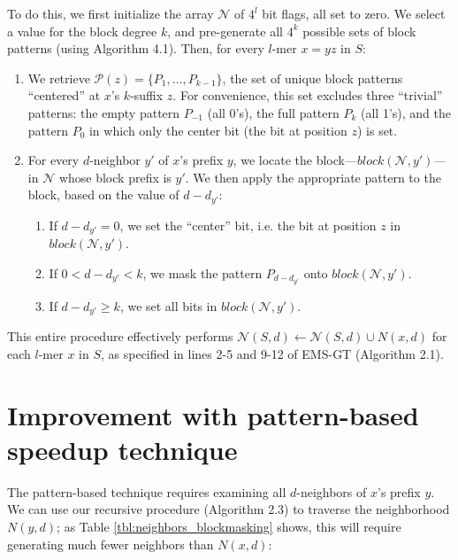 \documentclass[oneside,12pt]{DISCSthesis}
\begin{document}
{		To do this, we first initialize the array $\mathcal{N}$ of $4^l$ bit flags, all set to zero. We select a value for the block degree $k$, and pre-generate all $4^k$ possible sets of block patterns (using Algorithm 4.1). Then, for every $l$-mer $x = yz$ in $S$:
		\begin{enumerate}
			\item We retrieve $\mathcal{P}(z) = \{P_{1}, ... , P_{k-1}\}$, the set of unique block patterns ``centered'' at $x$'s $k$-suffix $z$. For convenience, this set excludes three ``trivial'' patterns: the empty pattern $P_{-1}$ (all 0's), the full pattern $P_{k}$ (all 1's), and the pattern $P_{0}$ in which only the center bit (the bit at position $z$) is set.
			\item For every $d$-neighbor $y'$ of $x$'s prefix $y$, we locate the block---$block(\mathcal{N}, y')$---in $\mathcal{N}$ whose block prefix is $y'$. We then apply the appropriate pattern to the block, based on the value of $d - d_{y'}$:
			\begin{enumerate}
				\item If $d - d_{y'} = 0$, we set the ``center'' bit, i.e. the bit at position $z$ in $block(\mathcal{N}, y')$.
				\item If $0 < d - d_{y'} < k$, we mask the pattern $P_{d - d_{y'}}$ onto $block(\mathcal{N}, y')$.
				\item If $d - d_{y'} \geq k$, we set all bits in $block(\mathcal{N}, y')$.
			\end{enumerate}
		\end{enumerate}

		\noindent This entire procedure effectively performs $\mathcal{N}(S,d) \leftarrow \mathcal{N}(S,d) \cup N(x,d)$ for each $l$-mer $x$ in $S$, as specified in lines 2-5 and 9-12 of EMS-GT (Algorithm 2.1).

	\section{Improvement with pattern-based speedup technique}
		The pattern-based technique requires examining all $d$-neighbors of $x$'s prefix $y$.
		We can use our recursive procedure (Algorithm 2.3) to traverse the neighborhood $N(y,d)$; as Table \ref{tbl:neighbors_blockmasking} shows, this will require generating much fewer neighbors than $N(x,d)$:\newline

}
\end{document}
